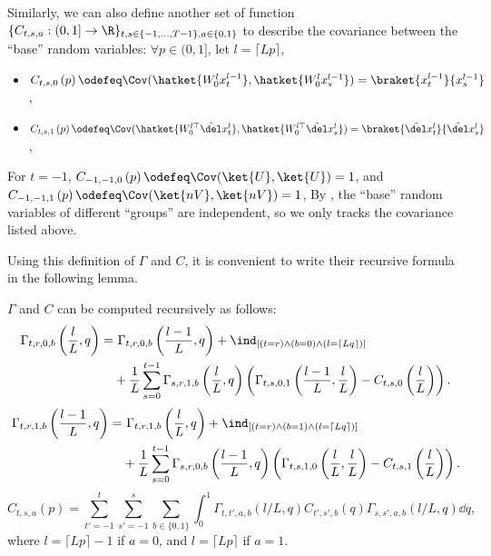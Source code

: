 Similarly, we can also define another set of function $\{C_{t,s,a}:(0, 1]\to \R\}_{t,s\in \{-1, \ldots, T-1\}, a\in \{0,1\}}$ to describe the covariance between the ``base'' random variables:  $\forall p\in (0,1]$, let $l=\lceil Lp\rceil$,
\begin{itemize}
    \item $C_{t,s,0}\left(p\right) \odefeq \Cov(\hatket{W_0^lx_t^{l-1}}, \hatket{W_0^lx_s^{l-1}})=\braket{x_t^{l-1}}{x_s^{l-1}}$,
    \item $C_{t,s,1}\left(p\right) \odefeq \Cov(\hatket{W_0^{l\top}\tilde\del x_t^l}, \hatket{W_0^{l\top}\tilde\del x_s^l})=\braket{\tilde\del x_t^l}{\tilde\del x_s^l}$,
\end{itemize}
For $t=-1$, $C_{-1,-1,0}\left(p\right) \odefeq \Cov(\ket{U}, \ket{U})=1$, and $C_{-1,-1,1}\left(p\right) \odefeq \Cov(\ket{nV}, \ket{nV})=1$,
By , the ``base'' random variables of different ``groups'' are independent, so we only tracks the covariance listed above.

Using this definition of $\Gamma$ and $C$, it is convenient to write their  recursive formula in the following lemma. 

\begin{lemma}\label{lemma:finite_depth_gamma}
$\Gamma$ and $C$ can be computed recursively as follows:
    \begin{align*} 
     \Gamma_{t,r,0,b}\left(\frac l L, q\right) = &~\Gamma_{t,r,0,b}\left(\frac{l-1}L, q\right) + \ind_{[(t=r) \wedge (b=0) \wedge (l=\lceil L q\rceil)]} \\
     & + \frac1L \sum_{s=0}^{t-1} \Gamma_{s,r,1,b}\left(\frac l L, q\right)\left(\Gamma_{t,s,0,1}\left(\frac{l-1}L, \frac l L\right)-C_{t,s,0}\left(\frac l L\right)\right).
    \end{align*}
    \begin{align*} 
     \Gamma_{t,r,1,b}\left(\frac {l-1} L, q\right) = &~\Gamma_{t,r,1,b}\left(\frac{l}L, q\right) + \ind_{[(t=r) \wedge (b=1) \wedge (l=\lceil L q\rceil)]} \\
     & + \frac1L \sum_{s=0}^{t-1} \Gamma_{s,r,0,b}\left(\frac {l-1} L, q\right)\left(\Gamma_{t,s,1,0}\left(\frac{l}L, \frac l L\right)-C_{t,s,1}\left(\frac l L\right)\right).
     \end{align*}
     \[C_{t,s,a}(p)=\sum_{t'=-1}^{t}\sum_{s'=-1}^{s}\sum_{b\in\{0,1\}}\int_0^1 \Gamma_{t,t',a,b}(l/L,q) C_{t',s',b}(q)\Gamma_{s,s',a,b}(l/L,q) \dd q,\] where $l=\lceil Lp\rceil -1$ if $a=0$, and  $l=\lceil Lp\rceil$ if $a=1$.
\end{lemma}

